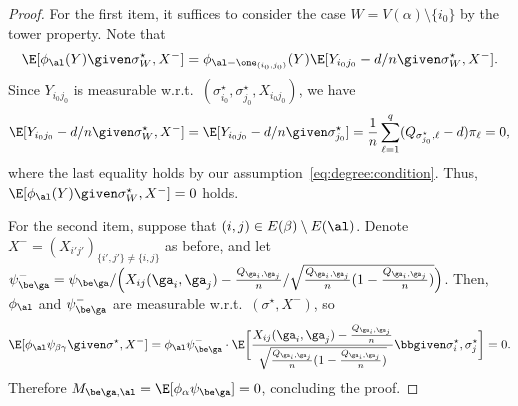 \documentclass[11pt]{article}
\begin{document}
\begin{proof}
For the first item, it suffices to consider the case $W=V(\alpha)\setminus \{i_0\}$ by the tower property. Note that
\[
\E[\phi_{\al}(Y)\given \sigma^\star_W,X^{-}]=\phi_{\al-\one_{(i_0,j_0)}}(Y)\E[Y_{i_0j_0}-d/n\given \sigma^\star_W, X^{-}].
\]
Since $Y_{i_0j_0}$ is measurable w.r.t.\ $(\sigma^\star_{i_0}, \sigma^\star_{j_0}, X_{i_0j_0})$, we have
\[
\E[Y_{i_0j_0}-d/n\given \sigma^\star_W, X^{-}]=\E[Y_{i_0j_0}-d/n\given \sigma^\star_{j_0}]=\frac{1}{n}\sum_{\ell=1}^{q}(Q_{\sigma^\star_{j_0},\ell}-d)\pi_{\ell}=0,
\]
where the last equality holds by our assumption~\eqref{eq:degree:condition}. Thus, $\E[\phi_{\al}(Y)\given \sigma^\star_W,X^{-}]=0$ holds.

For the second item, suppose that $(i,j)\in E(\beta)\setminus E(\al)$. Denote $X^{-}=(X_{i'j'})_{\{i',j'\}\neq \{i,j\}}$ as before, and let $\psi^{-}_{\be\ga}=\psi_{\be\ga}/\Big(X_{ij}(\ga_i,\ga_j)-\frac{Q_{\ga_i,\ga_j}}{n}/\sqrt{\frac{Q_{\ga_i,\ga_j}}{n}(1-\frac{Q_{\ga_i,\ga_j}}{n})}\Big)$. Then, $\phi_{\al}$ and $\psi^{-}_{\be\ga}$ are measurable w.r.t.\ $(\sigma^\star, X^{-})$, so
\[
\E[\phi_{\al}\psi_{\beta\gamma}\given \sigma^\star,X^{-}]=\phi_{\al}\psi^{-}_{\be\ga}\cdot \E\bigg[\frac{X_{ij}(\ga_i,\ga_j)-\frac{Q_{\ga_i,\ga_j}}{n}}{\sqrt{\frac{Q_{\ga_i,\ga_j}}{n}(1-\frac{Q_{\ga_i,\ga_j}}{n})}}\bbgiven \sigma^\star_i,\sigma^\star_j\bigg]=0.
\]
Therefore $M_{\be\ga,\al}=\E[\phi_{\alpha}\psi_{\be\ga}]=0$, concluding the proof.
\end{proof}
\end{document}
